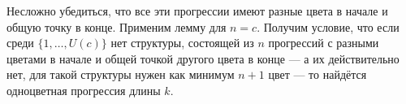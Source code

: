 \documentclass[a4paper]{report}
\begin{document}
{{{                Несложно убедиться, что все эти прогрессии имеют разные цвета в начале и общую точку в конце.
            }
            Применим лемму для $n = c$.
            Получим условие, что если среди $\{1, \dots, U(c)\}$ нет структуры, состоящей из $n$ прогрессий с разными цветами в начале и общей точкой другого цвета в конце --- а их действительно нет, для такой структуры нужен как минимум $n + 1$ цвет --- то найдётся одноцветная прогрессия длины $k$.
        }
    }
\end{document}

